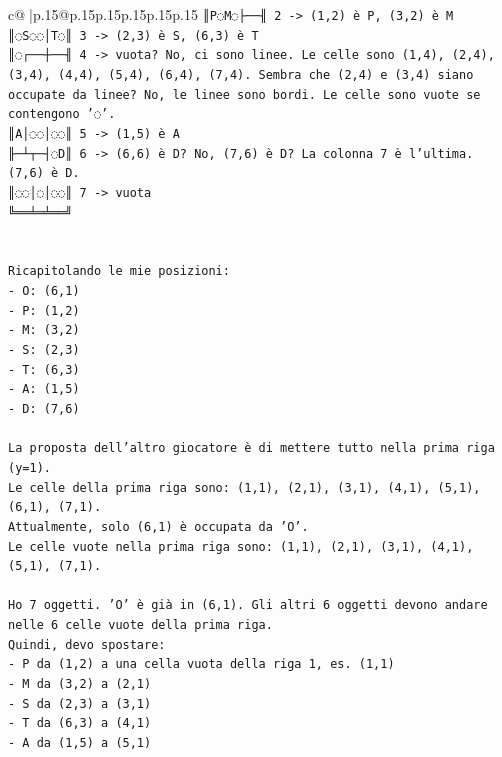 \documentclass{article}
\begin{document}
{\begin{supertabular}{c@{$\;$}|p{.15\linewidth}@{}p{.15\linewidth}p{.15\linewidth}p{.15\linewidth}p{.15\linewidth}p{.15\linewidth}}
{{{\texttt{║P◌M◌├──╢ 2  {-}> (1,2) è P, (3,2) è M} \\
\texttt{║◌S◌◌│T◌║ 3  {-}> (2,3) è S, (6,3) è T} \\
\texttt{║◌┌──┼──╢ 4  {-}> vuota? No, ci sono linee. Le celle sono (1,4), (2,4), (3,4), (4,4), (5,4), (6,4), (7,4). Sembra che (2,4) e (3,4) siano occupate da linee? No, le linee sono bordi. Le celle sono vuote se contengono '◌'.} \\
\texttt{║A│◌◌│◌◌║ 5  {-}> (1,5) è A} \\
\texttt{╟─┴┬─┤◌D║ 6  {-}> (6,6) è D? No, (7,6) è D? La colonna 7 è l'ultima. (7,6) è D.} \\
\texttt{║◌◌│◌│◌◌║ 7  {-}> vuota} \\
\texttt{╚══╧═╧══╝} \\
\\ 
\\ 
\texttt{Ricapitolando le mie posizioni:} \\
\texttt{{-} O: (6,1)} \\
\texttt{{-} P: (1,2)} \\
\texttt{{-} M: (3,2)} \\
\texttt{{-} S: (2,3)} \\
\texttt{{-} T: (6,3)} \\
\texttt{{-} A: (1,5)} \\
\texttt{{-} D: (7,6)} \\
\\ 
\texttt{La proposta dell'altro giocatore è di mettere tutto nella prima riga (y=1).} \\
\texttt{Le celle della prima riga sono: (1,1), (2,1), (3,1), (4,1), (5,1), (6,1), (7,1).} \\
\texttt{Attualmente, solo (6,1) è occupata da 'O'.} \\
\texttt{Le celle vuote nella prima riga sono: (1,1), (2,1), (3,1), (4,1), (5,1), (7,1).} \\
\\ 
\texttt{Ho 7 oggetti. 'O' è già in (6,1). Gli altri 6 oggetti devono andare nelle 6 celle vuote della prima riga.} \\
\texttt{Quindi, devo spostare:} \\
\texttt{{-} P da (1,2) a una cella vuota della riga 1, es. (1,1)} \\
\texttt{{-} M da (3,2) a (2,1)} \\
\texttt{{-} S da (2,3) a (3,1)} \\
\texttt{{-} T da (6,3) a (4,1)} \\
\texttt{{-} A da (1,5) a (5,1)} \\
}}}
\end{supertabular}}
\end{document}
